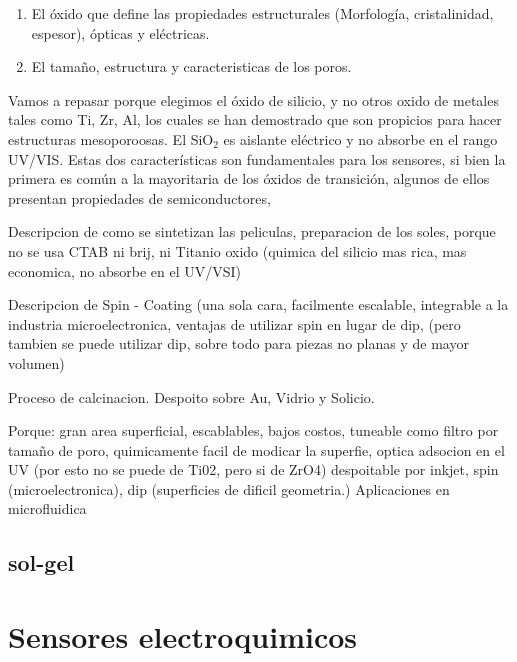 				\begin{enumerate}
					\item El óxido que define las propiedades estructurales (Morfología, cristalinidad, espesor), ópticas y eléctricas.
					\item El tamaño, estructura y caracteristicas de los poros.
				\end{enumerate}

				Vamos a repasar porque elegimos el óxido de silicio, y no otros oxido de metales tales como Ti, Zr, Al, los cuales se han demostrado que son propicios para hacer estructuras mesoporoosas. El SiO$_2$ es aislante eléctrico y no absorbe en el rango UV/VIS. Estas dos características son fundamentales para los sensores, si bien la primera es común a la mayoritaria de los óxidos de transición, algunos de ellos presentan propiedades de semiconductores, 

				Descripcion de como se sintetizan las peliculas, preparacion de los soles, porque no se usa CTAB ni brij, ni Titanio oxido (quimica del silicio mas rica, mas economica, no absorbe en el UV/VSI)

				Descripcion de Spin - Coating (una sola cara, facilmente escalable, integrable a la industria microelectronica, ventajas de utilizar spin en lugar de dip, (pero tambien se puede utilizar dip, sobre todo para piezas no planas y de mayor volumen)

				Proceso de calcinacion. Despoito sobre Au, Vidrio y Solicio.

				Porque: gran area superficial, escablables, bajos costos, tuneable como filtro por tamaño de poro, quimicamente facil de modicar la superfie, optica adsocion en el UV (por esto no se puede de Ti02, pero si de ZrO4) despoitable por inkjet\cite{Lian2013,Mougenot2006a}, spin (microelectronica), dip (superficies de dificil geometria.)
				Aplicaciones en microfluidica \cite{schmuhl2005,Martinez2009}
				
	\subsection{sol-gel}	

\section{Sensores electroquimicos}


